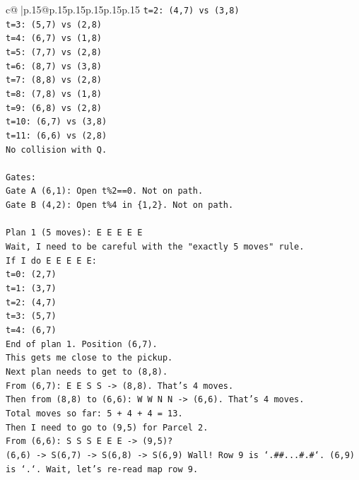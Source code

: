 \documentclass{article}
\begin{document}
{\begin{supertabular}{c@{$\;$}|p{.15\linewidth}@{}p{.15\linewidth}p{.15\linewidth}p{.15\linewidth}p{.15\linewidth}p{.15\linewidth}}
{{{\texttt{t=2: (4,7) vs (3,8)} \\
\texttt{t=3: (5,7) vs (2,8)} \\
\texttt{t=4: (6,7) vs (1,8)} \\
\texttt{t=5: (7,7) vs (2,8)} \\
\texttt{t=6: (8,7) vs (3,8)} \\
\texttt{t=7: (8,8) vs (2,8)} \\
\texttt{t=8: (7,8) vs (1,8)} \\
\texttt{t=9: (6,8) vs (2,8)} \\
\texttt{t=10: (6,7) vs (3,8)} \\
\texttt{t=11: (6,6) vs (2,8)} \\
\texttt{No collision with Q.} \\
\\ 
\texttt{Gates:} \\
\texttt{Gate A (6,1): Open t\%2==0. Not on path.} \\
\texttt{Gate B (4,2): Open t\%4 in \{1,2\}. Not on path.} \\
\\ 
\texttt{Plan 1 (5 moves): E E E E E} \\
\texttt{Wait, I need to be careful with the "exactly 5 moves" rule.} \\
\texttt{If I do E E E E E:} \\
\texttt{t=0: (2,7)} \\
\texttt{t=1: (3,7)} \\
\texttt{t=2: (4,7)} \\
\texttt{t=3: (5,7)} \\
\texttt{t=4: (6,7)} \\
\texttt{End of plan 1. Position (6,7).} \\
\texttt{This gets me close to the pickup.} \\
\texttt{Next plan needs to get to (8,8).} \\
\texttt{From (6,7): E E S S {-}> (8,8). That's 4 moves.} \\
\texttt{Then from (8,8) to (6,6): W W N N {-}> (6,6). That's 4 moves.} \\
\texttt{Total moves so far: 5 + 4 + 4 = 13.} \\
\texttt{Then I need to go to (9,5) for Parcel 2.} \\
\texttt{From (6,6): S S S E E E {-}> (9,5)?} \\
\texttt{(6,6) {-}> S(6,7) {-}> S(6,8) {-}> S(6,9) Wall! Row 9 is `.\#\#...\#.\#`. (6,9) is `.`. Wait, let's re{-}read map row 9.} \\
}}}
\end{supertabular}}
\end{document}

